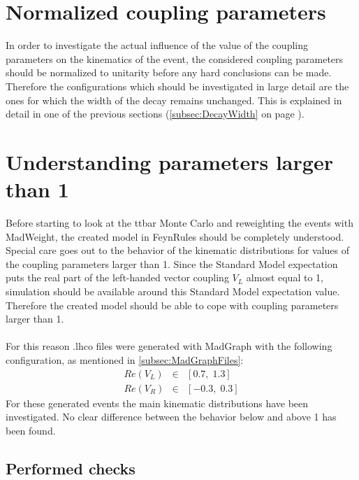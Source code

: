 
\section{Normalized coupling parameters}
In order to investigate the actual influence of the value of the coupling parameters on the kinematics of the event, the considered coupling parameters should be normalized to unitarity before any hard conclusions can be made.
Therefore the configurations which should be investigated in large detail are the ones for which the width of the decay remains unchanged. This is explained in detail in one of the previous sections (\ref{subsec:DecayWidth} on page \pageref{subsec:DecayWidth}).

\section{Understanding parameters larger than 1}
Before starting to look at the ttbar Monte Carlo and reweighting the events with MadWeight, the created model in FeynRules should be completely understood.
Special care goes out to the behavior of the kinematic distributions for values of the coupling parameters larger than 1. Since the Standard Model expectation puts the real part of the left-handed vector coupling $V_L$ almost equal to 1, simulation should be available around this Standard Model expectation value.
Therefore the created model should be able to cope with coupling parameters larger than 1. \\
\\
For this reason .lhco files were generated with MadGraph with the following configuration, as mentioned in \ref{subsec:MadGraphFiles}:
\begin{eqnarray*}
  Re(V_L) & \in & \left[  0.7, \; 1.3\right] \\
  Re(V_R) & \in & \left[ -0.3, \; 0.3\right]
\end{eqnarray*}
For these generated events the main kinematic distributions have been investigated.
No clear difference between the behavior below and above 1 has been found.

\newpage
\subsection{Performed checks}

